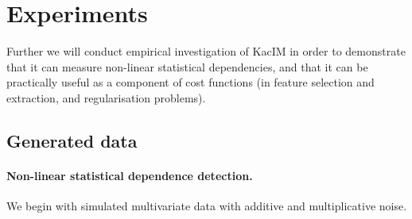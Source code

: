 \documentclass{article}
\begin{document}
\section{Experiments}
\label{section:experiments}

Further we will conduct empirical investigation of KacIM in order to demonstrate that it can measure non-linear statistical dependencies, and that it can be practically useful as a component of cost functions (in feature selection and extraction, and regularisation problems).

\subsection{Generated data}

\paragraph{Non-linear statistical dependence detection.} We begin with simulated multivariate data with additive and multiplicative noise.
\end{document}
